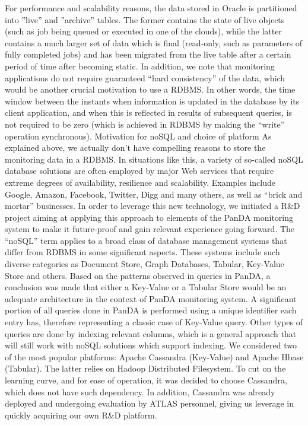 For performance and scalability reasons, the data stored in Oracle is partitioned into ''live'' and ''archive'' tables. The former contains the state of live objects (such as job being queued or executed in one of the clouds), while the latter contains a much larger set of data which is final (read-only, such as parameters of fully completed jobs) and has been migrated from the live table after a certain period of time after becoming static. In addition, we note that monitoring applications do not require guaranteed “hard consistency” of the data, which would be another crucial motivation to use a RDBMS. In other words, the time window between the instants when information is updated in the database by its client application, and when this is reflected in results of subsequent queries, is not required to be zero (which is achieved in RDBMS by making the “write” operation synchronous).
Motivation for noSQL and choice of platform
As explained above, we actually don’t have compelling reasons to store the monitoring data in a RDBMS. In situations like this, a variety of so-called noSQL database solutions are often employed by major Web services that require extreme degrees of availability, resilience and scalability. Examples include Google, Amazon, Facebook, Twitter, Digg and many others, as well as “brick and mortar” businesses. In order to leverage this new technology, we initiated a R\&D project aiming at applying this approach to elements of the PanDA monitoring system to make it future-proof and gain relevant experience going forward.
The “noSQL” term applies to a broad class of database management systems that differ from RDBMS in some significant aspects. These systems include such diverse categories as Document Store, Graph Databases, Tabular, Key-Value Store and others. Based on the patterns observed in queries in PanDA, a conclusion was made that either a Key-Value or a Tabular Store would be an adequate architecture in the context of PanDA monitoring system. A significant portion of all queries done in PanDA is performed using a unique identifier each entry has, therefore representing a classic case of Key-Value query. Other types of queries are done by indexing relevant columns, which is a general approach that will still work with noSQL solutions which support indexing.
We considered two of the most popular platforms: Apache Cassandra (Key-Value) and Apache Hbase (Tabular). The latter relies on Hadoop Distributed Filesystem. To cut on the learning curve, and for ease of operation, it was decided to choose Cassandra, which does not have such dependency. In addition, Cassandra was already deployed and undergoing evaluation by ATLAS personnel, giving us leverage in quickly acquiring our own R\&D platform.
